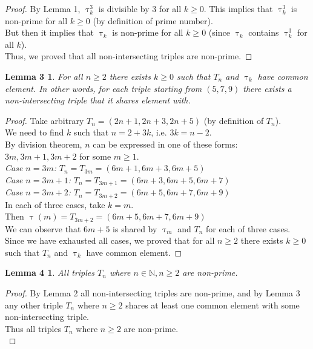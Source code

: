 \documentclass[11pt]{article}
\begin{document}
   \begin{proof}
   By Lemma 1, $\uptau_{k}^{3}$ is divisible by 3 for all $k \geq 0$. This implies that $\uptau_{k}^{3}$ is non-prime for all $k \geq 0$ (by definition of prime number).\\
   But then it implies that $\uptau_{k}$ is non-prime for all $k \geq 0$ (since $\uptau_{k}$ contains $\uptau_{k}^{3}$ for all $k$).\\
   Thus, we proved that all non-intersecting triples are non-prime.
   \end{proof}

   \newtheorem*{Lemma3}{Lemma 3}
   \begin{Lemma3}
       For all $n \geq 2$ there exists $k \geq 0$ such that $T_{n}$ and $\uptau_{k}$ have common element.
       In other words, for each triple starting from $(5, 7, 9)$ there exists a non-intersecting triple that it shares element with.
   \end{Lemma3}
   \begin{proof}
   Take arbitrary $T_{n} = (2n + 1, 2n + 3, 2n + 5)$ (by definition of $T_{n}$).\\
   We need to find $k$ such that $n = 2 + 3k$, i.e. $3k = n - 2$.\\
   By division theorem, $n$ can be expressed in one of these forms: $3m, 3m + 1, 3m + 2$ for some $m \geq 1$.\\
   \emph{Case $n = 3m$:} $T_{n} = T_{3m} = (6m + 1, 6m + 3, 6m + 5)$\\
   \emph{Case $n = 3m + 1$:} $T_{n} = T_{3m + 1} = (6m + 3, 6m + 5, 6m + 7)$\\
   \emph{Case $n = 3m + 2$:} $T_{n} = T_{3m + 2} = (6m + 5, 6m + 7, 6m + 9)$\\
   In each of three cases, take $k = m$.\\
   Then $\uptau(m) = T_{3m + 2} = (6m + 5, 6m + 7, 6m + 9)$\\
   We can observe that $6m + 5$ is shared by $\uptau_{m}$ and $T_{n}$ for each of three cases.\\
   Since we have exhausted all cases, we proved that for all $n \geq 2$ there exists $k \geq 0$ such that $T_{n}$ and $\uptau_{k}$ have common element.
   \end{proof}

   \newtheorem*{Lemma4}{Lemma 4}
   \begin{Lemma4}
   All triples $T_{n}$ where $n \in \mathbb{N}, n \geq 2$ are non-prime.
   \end{Lemma4}
   \begin{proof}
   By Lemma 2 all non-intersecting triples are non-prime, and by Lemma 3 any other triple $T_{n}$ where $n \geq 2$ shares at least one common element with some non-intersecting triple.\\
   Thus all triples $T_{n}$ where $n \geq 2$ are non-prime.\\
   \end{proof}
\end{document}

